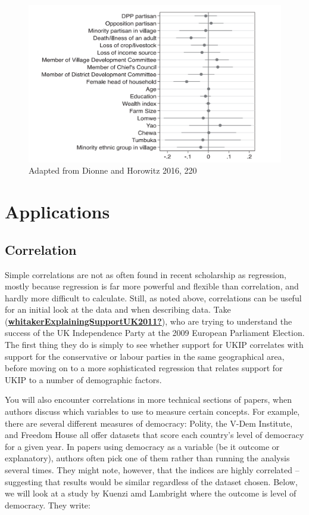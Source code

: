 \documentclass{book}
\begin{document}
\begin{figure}
\hypertarget{fig:dotwhisker}{%
\centering
\includegraphics{images/largen/dotwhisker.png}
\caption{Adapted from Dionne and Horowitz 2016, 220}\label{fig:dotwhisker}
}
\end{figure}

\hypertarget{applications-2}{%
\section{Applications}\label{applications-2}}

\hypertarget{correlation-1}{%
\subsection{Correlation}\label{correlation-1}}

Simple correlations are not as often found in recent scholarship as
regression, mostly because regression is far more powerful and flexible than
correlation, and hardly more difficult to calculate. Still, as noted above,
correlations can be useful for an initial look at the data and when describing
data. Take
(\protect\hyperlink{ref-whitakerExplainingSupportUK2011}{\textbf{whitakerExplainingSupportUK2011?}}),
who are trying to understand the success of the UK Independence Party at the
2009 European Parliament Election. The first thing they do is simply to see
whether support for UKIP correlates with support for the conservative or
labour parties in the same geographical area, before moving on to a more
sophisticated regression that relates support for UKIP to a number of
demographic factors.

You will also encounter correlations in more technical sections of papers,
when authors discuss which variables to use to measure certain concepts. For
example, there are several different measures of democracy: Polity, the V-Dem
Institute, and Freedom House all offer datasets that score each country's
level of democracy for a given year. In papers using democracy as a variable
(be it outcome or explanatory), authors often pick one of them rather than
running the analysis several times. They might note, however, that the indices
are highly correlated -- suggesting that results would be similar regardless
of the dataset chosen. Below, we will look at a study by Kuenzi amd Lambright
where the outcome is level of democracy. They write:
\end{document}
